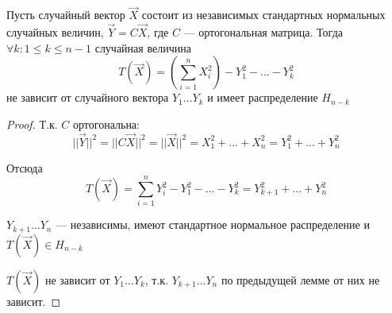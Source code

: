 \begin{lemma}[Фишера]
    Пусть случайный вектор \(\vec{X}\) состоит из независимых стандартных нормальных случайных величин, \(\vec{Y} = C \vec{X}\), где \(C\) --- ортогональная матрица. Тогда \(\forall k : 1 \leq k \leq n - 1\) случайная величина
    \[T(\vec{X}) = \left(\sum_{i=1}^{n} X_i^2\right) - Y_1^2 - \dots - Y_k^2\]
    не зависит от случайного вектора \(Y_1 \dots Y_k\) и имеет распределение \(H_{n - k}\)
\end{lemma}
\begin{proof}
    Т.к. \(C\) ортогональна:
    \[||\vec{Y}||^2 = ||C \vec{X}||^2 = ||\vec{X}||^2 = X_1^2 + \dots + X_n^2 = Y_1^2 + \dots + Y_n^2\]

    Отсюда
    \[T(\vec{X}) = \sum_{i=1}^{n} Y_i^2 - Y_1^2 - \dots - Y_k^2 = Y_{k+1}^2 + \dots + Y_n^2\]

    \(Y_{k+1} \dots Y_n\) --- независимы, имеют стандартное нормальное распределение и \(T(\vec{X}) \in H_{n - k}\)

    \(T(\vec{X})\) не зависит от \(Y_1 \dots Y_k\), т.к. \(Y_{k+1} \dots Y_n\) по предыдущей лемме от них не зависит.
\end{proof}

